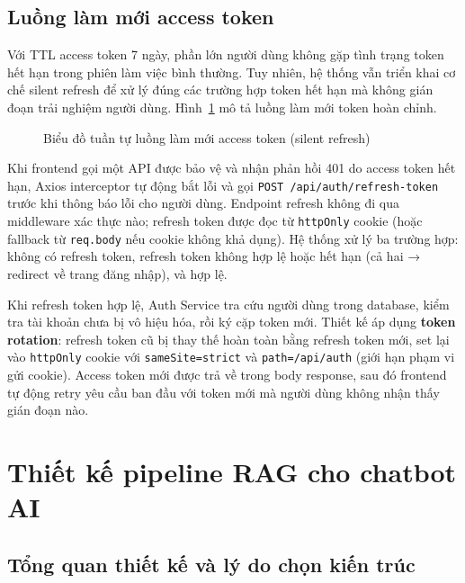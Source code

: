 \subsection{Luồng làm mới access token}
\label{sec:c3_token_refresh}

Với TTL access token 7 ngày, phần lớn người dùng không gặp tình trạng token hết hạn trong phiên làm việc bình thường. Tuy nhiên, hệ thống vẫn triển khai cơ chế silent refresh để xử lý đúng các trường hợp token hết hạn mà không gián đoạn trải nghiệm người dùng. Hình~\ref{fig:seq_token_refresh} mô tả luồng làm mới token hoàn chỉnh.

\clearpage
\begin{figure}[H]
  \centering
  \caption{Biểu đồ tuần tự luồng làm mới access token (silent refresh)}
  \label{fig:seq_token_refresh}
\end{figure}

Khi frontend gọi một API được bảo vệ và nhận phản hồi 401 do access token hết hạn, Axios interceptor tự động bắt lỗi và gọi \texttt{POST /api/auth/refresh-token} trước khi thông báo lỗi cho người dùng. Endpoint refresh không đi qua middleware xác thực nào; refresh token được đọc từ \texttt{httpOnly} cookie (hoặc fallback từ \texttt{req.body} nếu cookie không khả dụng). Hệ thống xử lý ba trường hợp: không có refresh token, refresh token không hợp lệ hoặc hết hạn (cả hai → redirect về trang đăng nhập), và hợp lệ.

Khi refresh token hợp lệ, Auth Service tra cứu người dùng trong database, kiểm tra tài khoản chưa bị vô hiệu hóa, rồi ký cặp token mới. Thiết kế áp dụng \textbf{token rotation}: refresh token cũ bị thay thế hoàn toàn bằng refresh token mới, set lại vào \texttt{httpOnly} cookie với \texttt{sameSite=strict} và \texttt{path=/api/auth} (giới hạn phạm vi gửi cookie). Access token mới được trả về trong body response, sau đó frontend tự động retry yêu cầu ban đầu với token mới mà người dùng không nhận thấy gián đoạn nào.

\section{Thiết kế pipeline RAG cho chatbot AI}
\label{sec:c3_rag_pipeline}

\subsection{Tổng quan thiết kế và lý do chọn kiến trúc}

